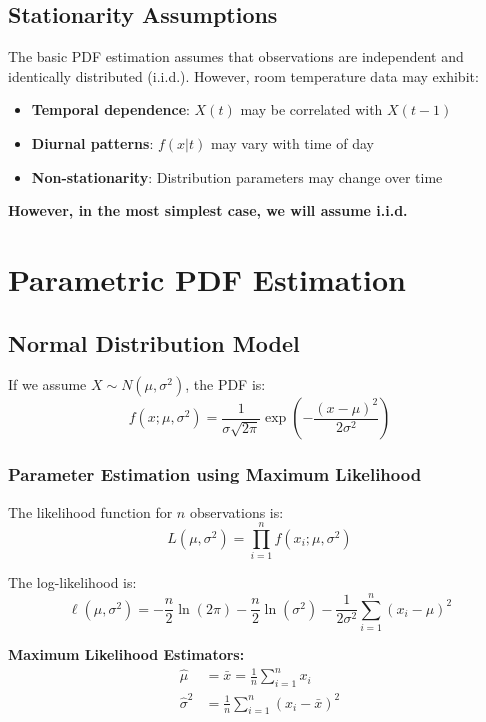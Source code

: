 \documentclass[12pt, xcolor=dvipsnames,svgnames,x11names]{article}
\begin{document}
\subsection{Stationarity Assumptions}

The basic PDF estimation assumes that observations are independent and identically distributed (i.i.d.). However, room temperature data may exhibit:
\begin{itemize}
\item \textbf{Temporal dependence}: $X(t)$ may be correlated with $X(t-1)$
\item \textbf{Diurnal patterns}: $f(x|t)$ may vary with time of day
\item \textbf{Non-stationarity}: Distribution parameters may change over time
\end{itemize}

\textbf{However, in the most simplest case, we will assume i.i.d.}
\section{Parametric PDF Estimation}

\subsection{Normal Distribution Model}

If we assume $X \sim N(\mu, \sigma^2)$, the PDF is:
\begin{equation}
f(x; \mu, \sigma^2) = \frac{1}{\sigma\sqrt{2\pi}} \exp\left(-\frac{(x-\mu)^2}{2\sigma^2}\right)
\end{equation}

\subsubsection{Parameter Estimation using Maximum Likelihood}

The likelihood function for $n$ observations is:
\begin{equation}
L(\mu, \sigma^2) = \prod_{i=1}^n f(x_i; \mu, \sigma^2)
\end{equation}

The log-likelihood is:
\begin{equation}
\ell(\mu, \sigma^2) = -\frac{n}{2} \ln(2\pi) - \frac{n}{2} \ln(\sigma^2) - \frac{1}{2\sigma^2} \sum_{i=1}^n (x_i - \mu)^2
\end{equation}

\textbf{Maximum Likelihood Estimators:}
\begin{align}
\hat{\mu} &= \bar{x} = \frac{1}{n} \sum_{i=1}^n x_i \\
\hat{\sigma}^2 &= \frac{1}{n} \sum_{i=1}^n (x_i - \bar{x})^2
\end{align}
\end{document}
